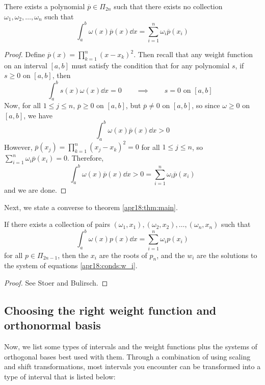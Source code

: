 \begin{thm}
  There exists a polynomial $\overline{p} \in \Pi_{2n}$ such that there exists no collection $\omega_1, \omega_2, \dots , \omega_n$ such that
  \[
    \int_a^b \omega(x) \overline{p}(x) \dd{x} = \sum_{i=1}^n \omega_i \overline{p}(x_i)
  \]
\end{thm}
\begin{proof}
  Define $\overline{p}(x) = \prod_{k = 1}^n (x - x_k)^2$. Then recall that any weight function on an interval $[a, b]$ must satisfy the condition that for any polynomial $s$, if $s \geq 0$ on $[a, b]$, then
  \[
    \int_a^b s(x) \omega(x) \dd{x} = 0
    \qquad \implies \qquad
    s = 0 \text{ on $[a, b]$ }
  \]
  Now, for all $1 \leq j \leq n$, $\overline{p} \geq 0$ on $[a, b]$, but $\overline{p} \neq 0$ on $[a, b]$, so since $\omega \geq 0$ on $[a, b]$, we have
  \[
    \int_a^b \omega(x) \overline{p}(x) \dd{x} > 0
  \]
  However, $\overline{p}(x_j) = \prod_{k = 1}^n (x_j - x_k)^2 = 0$ for all $1 \leq j \leq n$, so $\sum_{i=1}^n \omega_i \overline{p}(x_i) = 0$.
  Therefore,
  \[
    \int_a^b \omega(x) \overline{p}(x) \dd{x} > 0 = \sum_{i=1}^n \omega_i \overline{p}(x_i)
  \]
  and we are done.
  \hfill
\end{proof}
Next, we state a converse to theorem \ref{apr18:thm:main}.

\begin{thm}
  If there exists a collection of pairs $(\omega_1, x_1), (\omega_2, x_2), \dots , (\omega_n, x_n)$ such that
  \[
    \int_a^b \omega(x) p(x) \dd{x} = \sum_{i=1}^n \omega_i p(x_i)
  \]
  for all $p \in \Pi_{2n-1}$, then the $x_i$ are the roots of $p_n$, and the $w_i$ are the solutions to the system of equations \ref{apr18:conds:w_i}.
\end{thm}
\begin{proof}
  See Stoer and Bulirsch.
\end{proof}

\subsection{Choosing the right weight function and orthonormal basis}

Now, we list some types of intervals and the weight functions plus the systems of orthogonal bases best used with them. Through a combination of using scaling and shift transformations, most intervals you encounter can be transformed into a type of interval that is listed below:

